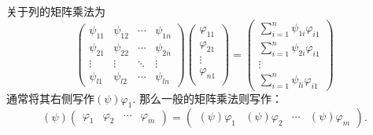 关于列的矩阵乘法为
\begin{equation}
\begin{pmatrix}
	\psi_{11} & \psi_{12} & \cdots & \psi_{1n}\\
	\psi_{21} & \psi_{22} & \cdots & \psi_{2n}\\
	\vdots & \vdots & \ddots & \vdots \\
	\psi_{l1} & \psi_{l2} & \cdots & \psi_{ln}
\end{pmatrix}
\begin{pmatrix}
	\varphi_{11} \\
	\varphi_{21}  \\
	\vdots \\
	\varphi_{n1} \\
\end{pmatrix}
=
\begin{pmatrix}
	\sum_{i=1}^n \psi_{1i}\varphi_{i1}\\
	\sum_{i=1}^n \psi_{2i}\varphi_{i1} \\
	\vdots \\
	\sum_{i=1}^n \psi_{li}\varphi_{i1}
\end{pmatrix}
\end{equation}
通常将其右侧写作$(\psi)\varphi_1$. 那么一般的矩阵乘法则写作：
\[
	(\psi)
	\begin{pmatrix}
	\varphi_{1} & \varphi_{2} & \cdots & \varphi_{m}
	\end{pmatrix}
	=
	\begin{pmatrix}
	(\psi)\varphi_{1} & (\psi)\varphi_{2} & \cdots & (\psi)\varphi_{m}
	\end{pmatrix}.
\]
